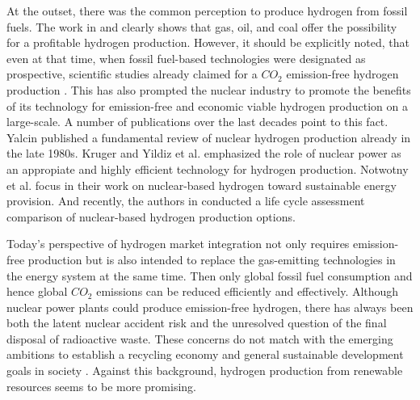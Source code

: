 \documentclass[review]{elsarticle}
\begin{document}
At the outset, there was the common perception to produce hydrogen from fossil fuels. The work in \cite{steinberg1989modern} and \cite{kathe2016hydrogen} clearly shows that gas, oil, and coal offer the possibility for a profitable hydrogen production. However, it should be explicitly noted, that even at that time, when fossil fuel-based technologies were designated as prospective, scientific studies already claimed for a $CO_2$ emission-free hydrogen production \cite{muradov1993produce}. This has also prompted the nuclear industry to promote the benefits of its technology for emission-free and economic viable hydrogen production on a large-scale. A number of publications over the last decades point to this fact. Yalcin \cite{yalcin1989review} published a fundamental review of nuclear hydrogen production already in the late 1980s. Kruger \cite{kruger2009nuclear} and Yildiz et al. \cite{yildiz2006efficiency} emphasized the role of nuclear power as an appropiate and highly efficient technology for hydrogen production. Notwotny et al. \cite{nowotny2016towards} focus in their work on nuclear-based hydrogen toward sustainable energy provision. And recently, the authors in \cite{karaca2020life} conducted a life cycle assessment comparison of nuclear-based hydrogen production options.\vspace{0.3cm}

Today's perspective of hydrogen market integration not only requires emission-free production but is also intended to replace the gas-emitting technologies in the energy system at the same time. Then only global fossil fuel consumption \cite{midilli2008hydrogen} and hence global $CO_2$ emissions can be reduced efficiently and effectively. Although nuclear power plants could produce emission-free hydrogen, there has always been both the latent nuclear accident risk and the unresolved question of the final disposal of radioactive waste. These concerns do not match with the emerging ambitions to establish a recycling economy and general sustainable development goals in society \cite{sdg2018sustainable}. Against this background, hydrogen production from renewable resources seems to be more promising.\vspace{0.3cm} 
\end{document}
